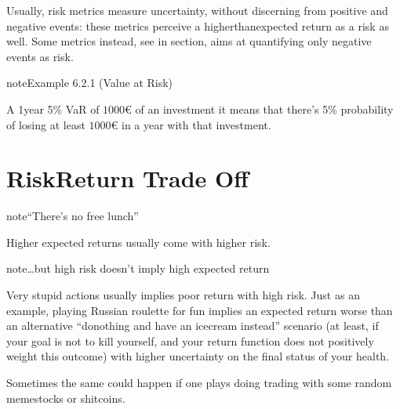 \documentclass[letterpaper,10pt,english]{jupyterBook}
\begin{document}
\sphinxAtStartPar
Usually, risk metrics measure uncertainty, without discerning from positive and negative events: these metrics perceive a higher\sphinxhyphen{}than\sphinxhyphen{}expected return as a risk as well. Some metrics instead, see  in {\hyperref[\detokenize{ch/principles/intro_nb:fin-edu-principles-rr}]{}} section, aims at quantifying only negative events as risk.
\label{ch/principles/intro_nb:example-2}
\begin{sphinxadmonition}{note}{Example 6.2.1 (Value at Risk)}



\sphinxAtStartPar
A 1\sphinxhyphen{}year 5\% VaR of \(1000\text{€}\) of an investment it means that there’s 5\% probability of losing at least \(1000\text{€}\) in a year with that investment.
\end{sphinxadmonition}


\section{Risk\sphinxhyphen{}Return Trade Off}
\label{\detokenize{ch/principles/intro_nb:risk-return-trade-off}}\label{\detokenize{ch/principles/intro_nb:fin-edu-principles-rr}}
\begin{sphinxadmonition}{note}{“There’s no free lunch”}

\sphinxAtStartPar
Higher expected returns usually come with higher risk.
\end{sphinxadmonition}

\begin{sphinxadmonition}{note}{…but high risk doesn’t imply high expected return}

\sphinxAtStartPar
Very stupid actions usually implies poor return with high risk. Just as an example, playing Russian roulette for fun implies an expected return worse than an alternative “do\sphinxhyphen{}nothing and have an ice\sphinxhyphen{}cream instead” scenario (at least, if your goal is not to kill yourself, and your return function does not positively weight this outcome) with higher uncertainty on the final status of your health.

\sphinxAtStartPar
Sometimes the same could happen if one plays doing trading with some random meme\sphinxhyphen{}stocks or shit\sphinxhyphen{}coins.
\end{sphinxadmonition}
\end{document}
